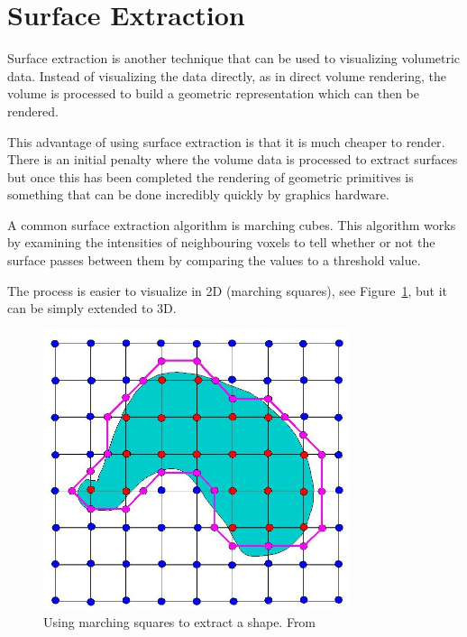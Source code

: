 \section{Surface Extraction}\label{background:surfaceextraction}
Surface extraction is another technique that can be used to visualizing volumetric data. Instead of visualizing the data directly, as in direct volume rendering, the volume is processed to build a geometric representation which can then be rendered.

This advantage of using surface extraction is that it is much cheaper to render\cite{surfacevsvolumerendering}. There is an initial penalty where the volume data is processed to extract surfaces but once this has been completed the rendering of geometric primitives is something that can be done incredibly quickly by graphics hardware.

A common surface extraction algorithm is marching cubes. This algorithm works by examining the intensities of neighbouring voxels to tell whether or not the surface passes between them by comparing the values to a threshold value. 

The process is easier to visualize in 2D (marching squares), see Figure~\ref{fig:marching_squares}, but it can be simply extended to 3D.

\begin{figure}[H]
    \centering
	\includegraphics[width=0.8\textwidth]{images/background/marching_squares.jpg}
    \caption{Using marching squares to extract a shape. From \cite{marching_squares:image}}
    \label{fig:marching_squares}
\end{figure}

